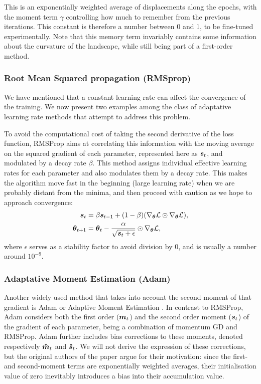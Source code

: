 This is an exponentially weighted average of displacements along the epochs, with the moment term $\gamma$ controlling how much to remember from the previous iterations. This constant is therefore a number between 0 and 1, to be fine-tuned experimentally. Note that this memory term invariably contains some information about the curvature of the landscape, while still being part of a first-order method.

\subsubsection{Root Mean Squared propagation (RMSprop)}

We have mentioned that a constant learning rate can affect the convergence of the training. We now present two examples among the class of adaptative learning rate methods that attempt to address this problem.

To avoid the computational cost of taking the second derivative of the loss function, RMSProp \cite{graves2013generating} aims at correlating this information with the moving average on the squared gradient of each parameter, represented here as $\boldsymbol{s}_t$, and modulated by a decay rate $\beta$. This method assigns individual effective learning rates for each parameter and also modulates them by a decay rate. This makes the algorithm move fast in the beginning (large learning rate) when we are probably distant from the minima, and then proceed with caution as we hope to approach convergence:
\begin{align*}
    \boldsymbol{s}_t &= \beta \boldsymbol{s}_{t-1}  + (1- \beta)(\nabla_{\boldsymbol{\theta}} \mathcal{L}\odot \nabla_{\boldsymbol{\theta}} \mathcal{L}), \\
    \boldsymbol{\theta}_{t+1} &= \boldsymbol{\theta}_{t} -  \frac{\alpha}{\sqrt{\boldsymbol{s}_t + \epsilon}} \odot \nabla_{\boldsymbol{\theta}}\mathcal{L},
\end{align*}
where $\epsilon$ serves as a stability factor to avoid division by 0, and is usually a number around $10^{-9}$.

\subsubsection{Adaptative Moment Estimation (Adam)} 

Another widely used method that takes into account the second moment of that gradient is Adam or Adaptive Moment Estimation \cite{kingma2014adam}. In contrast to RMSProp, Adam considers both the first order ($\boldsymbol{m}_t$) and the second order moment ($\boldsymbol{s}_t$) of the gradient of each parameter, being a combination of momentum GD and RMSProp. Adam further includes bias corrections to these moments, denoted respectively $\boldsymbol{\hat{m}}_t$ and $\boldsymbol{\hat{s}}_t$. We will not derive the expression of these corrections, but the original authors of the paper argue for their motivation: since the first- and second-moment terms are exponentially weighted averages, their initialisation value of zero inevitably introduces a bias into their accumulation value. 

